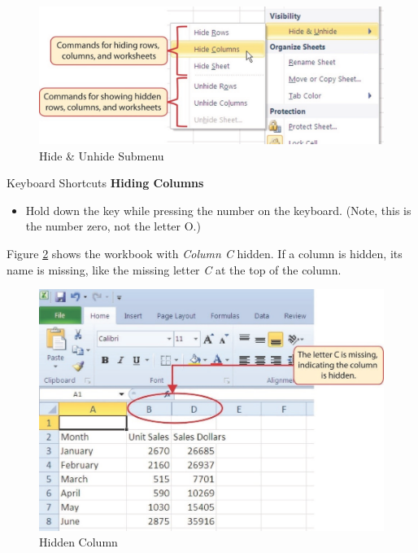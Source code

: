 \begin{figure}[H]
	\centering
	\includegraphics[width=\maxwidth{.95\linewidth}]{gfx/ch01_fig26}
	\caption{Hide \& Unhide Submenu}
	\label{01:fig26}
\end{figure}

\begin{center}
	\begin{shtcutbox}{Keyboard Shortcuts}
		\textbf{Hiding Columns}
		\\
		\begin{itemize}
			\setlength{\itemsep}{0pt}
			\setlength{\parskip}{0pt}
			\setlength{\parsep}{0pt}
			
			\item Hold down the  key while pressing the number  on the keyboard. (Note, this is the number zero, not the letter O.)
			
		\end{itemize}
	\end{shtcutbox}
\end{center}

Figure \ref{01:fig27} shows the workbook with \textit{Column C} hidden. If a column is hidden, its name is missing, like the missing letter \textit{C} at the top of the column.

\begin{figure}[H]
	\centering
	\includegraphics[width=\maxwidth{.95\linewidth}]{gfx/ch01_fig27}
	\caption{Hidden Column}
	\label{01:fig27}
\end{figure}

